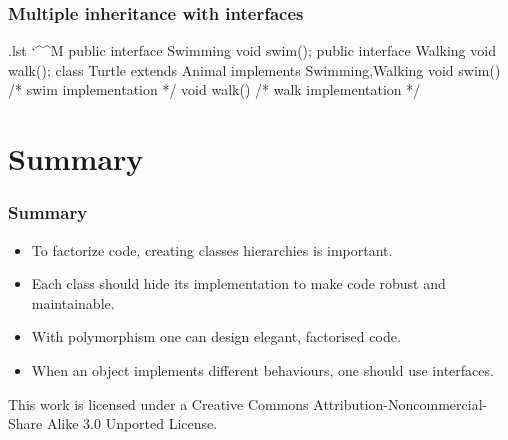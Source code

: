 \documentclass[10pt, handout]{beamer}
\makeatletter
\newenvironment{code}{%
  \begingroup
  \@bsphack
  \immediate\openout\lstvrb@out\jobname.lst
  \let\do\@makeother\dospecials\catcode`\^^M\active
  \def\verbatim@processline{%
    \immediate\write\lstvrb@out{\the\verbatim@line}}%
  \verbatim@start}{%
  \immediate\closeout\lstvrb@out
  \@esphack
  \endgroup
  
  \begin{alertblock}{}
    
  \end{alertblock}}
\makeatother
\begin{document}
\begin{frame}[fragile]
  \frametitle{Multiple inheritance with interfaces}
  \begin{center}
  \end{center}
\end{frame}

\begin{frame}[fragile]
  \begin{code}
  public interface Swimming {
    void swim();
  }
  public interface Walking {
    void walk();
  }
  class Turtle extends Animal 
               implements Swimming,Walking{
    void swim() { /* swim implementation */}
    void walk() { /* walk implementation */}
  }
  \end{code}
\end{frame}

\section{Summary}
\begin{frame}
  \frametitle{Summary}
  
  \begin{itemize}
    \item To factorize code, creating classes hierarchies is
      important.
    \item Each class should hide its implementation to make code
      robust and maintainable.
    \item With polymorphism one can design elegant, factorised code.
    \item When an object implements different behaviours, one should
      use interfaces.
  \end{itemize}
\end{frame}

\begin{frame}
\begin{center}
  \tiny
  This work is licensed under a Creative Commons Attribution-Noncommercial-Share Alike 3.0 Unported License.
\end{center}
\end{frame}
\end{document}
